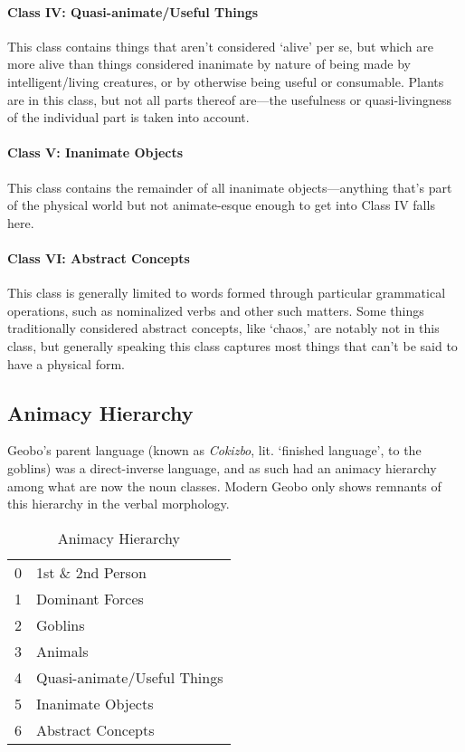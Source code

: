 \documentclass[a4paper,11pt,oneside,openany]{memoir}
\begin{document}
\paragraph{Class IV: Quasi-animate/Useful Things}

This class contains things that aren't considered `alive' per se, but which are more alive than things considered inanimate by nature of being made by intelligent/living creatures, or by otherwise being useful or consumable. Plants are in this class, but not all parts thereof are---the usefulness or quasi-livingness of the individual part is taken into account.

\paragraph{Class V: Inanimate Objects}

This class contains the remainder of all inanimate objects---anything that's part of the physical world but not animate-esque enough to get into Class IV falls here.

\paragraph{Class VI: Abstract Concepts}

This class is generally limited to words formed through particular grammatical operations, such as nominalized verbs and other such matters. Some things traditionally considered abstract concepts, like `chaos,' are notably not in this class, but generally speaking this class captures most things that can't be said to have a physical form.

\subsection{Animacy Hierarchy}

Geobo{\engma}'s parent language (known as \textit{Cokizbo\engma}, lit. `finished language', to the goblins) was a direct-inverse language, and as such had an animacy hierarchy among what are now the noun classes. Modern Geobo{\engma} only shows remnants of this hierarchy in the verbal morphology.

\begin{table}[h]
    \centering
    \begin{tabular}{@{}rl@{}}
    \toprule
0 & 1st \& 2nd Person \\
1 & Dominant Forces \\
2 & Goblins \\
3 & Animals \\
4 & Quasi-animate/Useful Things \\
5 & Inanimate Objects \\
6 & Abstract Concepts \\
\bottomrule
\end{tabular}
    \caption{Animacy Hierarchy}
    \label{tab:anim}
\end{table}
\end{document}
